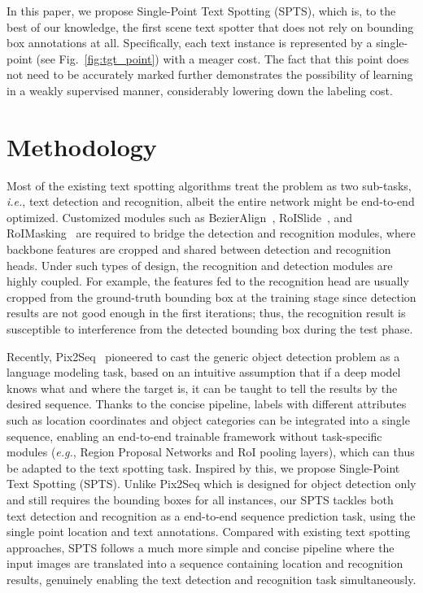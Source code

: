 \documentclass[sigconf]{acmart}
\newcommand{\methodName}{SPTS}
\begin{document}
In this paper, we propose Single-Point Text Spotting (\methodName), which is, to the best of our knowledge, the first scene text spotter that does not rely on bounding box annotations at all. Specifically, each text instance is represented by a single-point (see Fig.~\ref{fig:tgt_point}) with a meager cost. The fact that this point does not need to be accurately marked further demonstrates the possibility of learning in a weakly supervised manner, considerably lowering down the labeling cost.

\section{Methodology}\label{sec:method}
Most of the existing text spotting algorithms treat the problem as two sub-tasks, \emph{i.e.}, text detection and recognition, albeit the entire network might be end-to-end optimized. Customized modules such as BezierAlign~\cite{liu2020abcnet}, RoISlide~\cite{feng2019textdragon}, and RoIMasking~\cite{liao2020masktext} are required to bridge the detection and recognition modules, where backbone features are cropped and shared between detection and recognition heads. Under such types of design, the recognition and detection modules are highly coupled. For example, the features fed to the recognition head are usually cropped from the ground-truth bounding box at the training stage since  detection results are not good enough in the first iterations; thus, the recognition result is susceptible to interference from the detected bounding box during the test phase.

Recently, Pix2Seq~\cite{chen2021pix2seq} pioneered to cast the generic object detection problem as a language modeling task, based on an intuitive assumption that if a deep model knows what and where the target is, it can be taught to tell the results by the desired sequence. Thanks to the concise pipeline, labels with different attributes such as location coordinates and object categories can be integrated into a single sequence, enabling an end-to-end trainable framework without task-specific modules (\emph{e.g.}, Region Proposal Networks and RoI pooling layers), which can thus be adapted to the text spotting task. Inspired by this, we propose Single-Point Text Spotting (\methodName). Unlike Pix2Seq which is designed for object detection only and still requires the bounding boxes for all instances, our SPTS tackles both text detection and recognition as a end-to-end sequence prediction task, using the single point location and text annotations. Compared with existing text spotting approaches, SPTS follows a much more simple and concise pipeline where the input images are translated into a sequence containing location and recognition results, genuinely enabling the text detection and recognition task simultaneously.
\end{document}
